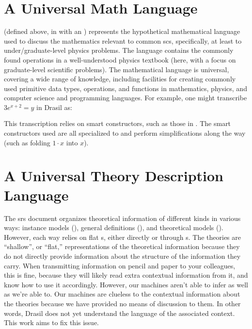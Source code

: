 \section{A Universal Math Language}
\label{sec:modelkinds:language}

\originalExprHaskell

\Expr{} (defined above, in  with an )
represents the hypothetical mathematical language used to discuss the
mathematics relevant to common \acs{scs}, specifically, at least to
under/graduate-level physics problems. The language contains the commonly found
operations in a well-understood physics textbook (here, with a focus on
graduate-level scientific problems). The mathematical language is universal,
covering a wide range of knowledge, including facilities for creating commonly
used primitive data types, operations, and functions  in mathematics, physics,
and computer science and programming languages. For example, one might
transcribe \(3 e^{x + 2} = y\) in Drasil as:

\pseudoExampleExpression{}

This transcription relies on smart constructors, such as those in
. The smart constructors used are
all specialized to \Expr{} and perform simplifications along the way (such as
folding \(1 \cdot x\) into \(x\)).

\section{A Universal Theory Description Language}

The \acs{srs} document organizes theoretical information of different kinds in
various ways: instance models (\InstanceModel{}), general definitions
(\GenDefn{}), and theoretical models (\TheoryModel{}). However, each way relies
on flat \Relation{}s, either directly or through \RelationConcept{}s. The
theories are ``shallow'', or ``flat,'' representations of the theoretical
information because they do not directly provide information about the structure
of the information they carry. When transmitting information on pencil and paper
to your colleagues, this is fine, because they will likely read extra contextual
information from it, and know how to use it accordingly. However, our machines
aren't able to infer as well as we're able to. Our machines are clueless to the
contextual information about the theories because we have provided no means of
discussion to them. In other words, Drasil does not yet understand the language
of the associated context. This work aims to fix this issue.

